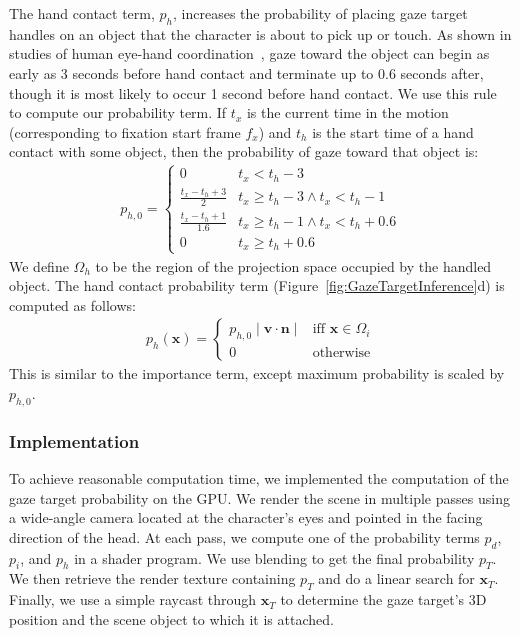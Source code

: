 The hand contact term, $p_h$, increases the probability of placing gaze target handles on an object that the character is about to pick up or touch. As shown in studies of human eye-hand coordination~\citep{johansson2001eyehead}, gaze toward the object can begin as early as 3 seconds before hand contact and terminate up to 0.6 seconds after, though it is most likely to occur 1 second before hand contact. We use this rule to compute our probability term. If $t_x$ is the current time in the motion (corresponding to fixation start frame $f_x$) and $t_h$ is the start time of a hand contact with some object, then the probability of gaze toward that object is:
%
\begin{align} \label{eq:GazeHandContactProbabilityTime}
p_{h,0} =
\begin{cases}
0 & t_x < t_h - 3 \\
\frac{t_x - t_h + 3}{2} & t_x \geq t_h - 3 \wedge t_x < t_h - 1 \\
\frac{t_x - t_h + 1}{1.6} & t_x \geq t_h - 1 \wedge t_x < t_h + 0.6 \\
0 & t_x \geq t_h + 0.6
\end{cases}
\end{align}
%
We define $\Omega_h$ to be the region of the projection space occupied by the handled object. The hand contact probability term (Figure~\ref{fig:GazeTargetInference}d) is computed as follows:
%
\begin{align} \label{eq:GazeHandContactProbability}
p_h(\mathbf{x}) =
\begin{cases}
p_{h,0} \mid \mathbf{v} \cdot \mathbf{n} \mid & \text{iff } \mathbf{x} \in \Omega_i  \\
0 & \text{otherwise}
\end{cases}
\end{align}
%
This is similar to the importance term, except maximum probability is scaled by $p_{h,0}$.

\subsubsection{Implementation}

To achieve reasonable computation time, we implemented the computation of the gaze target probability on the GPU. We render the scene in multiple passes using a wide-angle camera located at the character's eyes and pointed in the facing direction of the head. At each pass, we compute one of the probability terms $p_d$, $p_i$, and $p_h$ in a shader program. We use blending to get the final probability $p_T$. We then retrieve the render texture containing $p_T$ and do a linear search for $\mathbf{x}_T$. Finally, we use a simple raycast through $\mathbf{x}_T$ to determine the gaze target's 3D position and the scene object to which it is attached.

